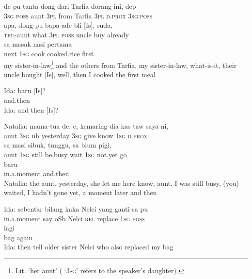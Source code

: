 \ea
\gll   de    {pu}    {tanta}    {dong}    {dari}    {Tarfia}    {dorang}    {ini,}   dep\\
  \textsc{3sg}    {\textsc{poss}}    {aunt}    {\textsc{3pl}}    {from}    {Tarfia}    {\textsc{3pl}}    {\textsc{d.prox}}   \textsc{3sg}:\textsc{poss}\\
    {apa,}    {dong}    {pu}    {bapa-ade}   bli    {[Is],}    {suda,}\\
   {\textsc{tru}{}-aunt}    {what}    {\textsc{3pl}}    {\textsc{poss}}    {uncle}   buy    {}    {already}\\
    {sa}    {masak}    {nasi}    {pertama}\\
   {next}    {\textsc{1sg}}    {cook}    {cooked.rice}    {first}\\
\glt
my sister-in-law\footnote{Lit. ‘her aunt’ ( ‘\textsc{3sg}’ refers to the speaker’s daughter).} and the others from Tarfia, my sister-in-law, what-is-it, their uncle bought [Is], well, then I cooked the first meal
\z

\ea
\gll   Ida:   baru   [Is]?\\
{}     and.then   \\
\glt
Ida: and then [Is]?
\z

\ea
\gll Natalia:    {mama-tua}    {de,}   e,    {kemaring}    {dia}    {kas}   taw   saya   ni,\\
 {}     {aunt}    {\textsc{3sg}}   uh    {yesterday}    {\textsc{3sg}}    {give}   know   \textsc{1sg}   \textsc{d.prox}\\
    {sa}    {masi}    {sibuk,}    {tunggu,}    {sa}    {blum}    {pigi,}\\
   {aunt}    {\textsc{1sg}}    {still}    {be.busy}    {wait}    {\textsc{1sg}}    {not.yet}    {go}\\
    {baru}\\
   {in.a.moment}    {and.then}\\
\glt
Natalia: the aunt, yesterday, she let me here know, aunt, I was still busy, (you) waited, I hadn’t gone yet, a moment later and then
\z

\ea
\gll   Ida:    {sebentar}   bilang   kaka   Nelci   yang   ganti   sa   pu\\
 {}     {in.a.moment}   say   oSb   Nelci   \textsc{rel}   replace   \textsc{1sg}   \textsc{poss}\\
    {lagi}\\
   {bag}    {again}\\
\glt
Ida: then tell older sister Nelci who also replaced my bag
\z

